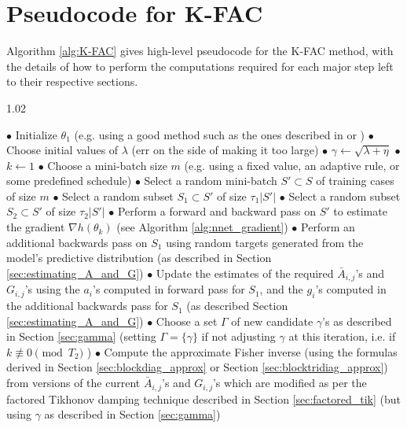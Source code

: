 \documentclass[12pt]{article}
\newcommand{\acronym}{K-FAC}
\begin{document}
\section{Pseudocode for \acronym{}}
\label{sec:pseudocode}
\vspace{-0.2in}
Algorithm \ref{alg:K-FAC} gives high-level pseudocode for the \acronym{} method, with the details of how to perform the computations required for each major step left to their respective sections.
\begin{algorithm}[H]
\small
\begin{spacing}{1.02}
\begin{algorithmic}
\STATE $\bullet$ Initialize $\theta_1$ (e.g. using a good method such as the ones described in \citet{HF} or \citet{bengio_glorot})
\STATE $\bullet$ Choose initial values of $\lambda$ (err on the side of making it too large)
\STATE $\bullet$ $\gamma \gets \sqrt{\lambda + \eta}$ 
\STATE $\bullet$ $k \gets 1$
\STATE $\bullet$ Choose a mini-batch size $m$ (e.g. using a fixed value, an adaptive rule, or some predefined schedule)
\STATE $\bullet$ Select a random mini-batch $S' \subset S$ of training cases of size $m$
\STATE $\bullet$ Select a random subset $S_1 \subset S'$ of size $\tau_1 |S'|$
\STATE $\bullet$ Select a random subset $S_2 \subset S'$ of size $\tau_2 |S'|$
\STATE $\bullet$ Perform a forward and backward pass on $S'$ to estimate the gradient $\nabla h(\theta_k)$ (see Algorithm \ref{alg:nnet_gradient})
\STATE $\bullet$ Perform an additional backwards pass on $S_1$ using random targets generated from the model's predictive distribution (as described in Section \ref{sec:estimating_A_and_G})
\STATE $\bullet$ Update the estimates of the required $\bar{A}_{i,j}$'s and $G_{i,j}$'s using the $a_i$'s computed in forward pass for $S_1$, and the $g_i$'s computed in the additional backwards pass for $S_1$ (as described Section \ref{sec:estimating_A_and_G})
\STATE $\bullet$ Choose a set $\Gamma$ of new candidate $\gamma$'s as described in Section \ref{sec:gamma} (setting $\Gamma = \{\gamma\}$ if not adjusting $\gamma$ at this iteration, i.e. if $k \not\equiv 0 \pmod{T_2}$ )
\STATE $\bullet$ Compute the approximate Fisher inverse (using the formulas derived in Section \ref{sec:blockdiag_approx} or Section \ref{sec:blocktridiag_approx}) from versions of the current $\bar{A}_{i,j}$'s and $G_{i,j}$'s which are modified as per the factored Tikhonov damping technique described in Section \ref{sec:factored_tik} (but using $\gamma$ as described in Section \ref{sec:gamma})

\end{algorithmic}
\end{spacing}
\end{algorithm}
\end{document}
